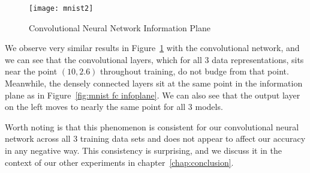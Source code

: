 \begin{figure}[h!]
\begin{center}
\texttt{[image: mnist2]}
\caption{Convolutional Neural Network Information Plane}
\label{fig:mnist conv infoplane}
\centering
\end{center}
\end{figure}

We observe very similar results in Figure~\ref{fig:mnist conv infoplane} with the convolutional network, and we can see that the convolutional layers, which for all 3 data representations, sits near the point $(10, 2.6)$ throughout training, do not budge from that point. 
Meanwhile, the densely connected layers sit at the same point in the information plane as in Figure~\ref{fig:mnist fc infoplane}.
We can also see that the output layer on the left moves to nearly the same point for all 3 models.

Worth noting is that this phenomenon is consistent for our convolutional neural network across all 3 training data sets and does not appear to affect our accuracy in any negative way.
This consistency is surprising, and we discuss it in the context of our other experiments in chapter~\ref{chap:conclusion}.